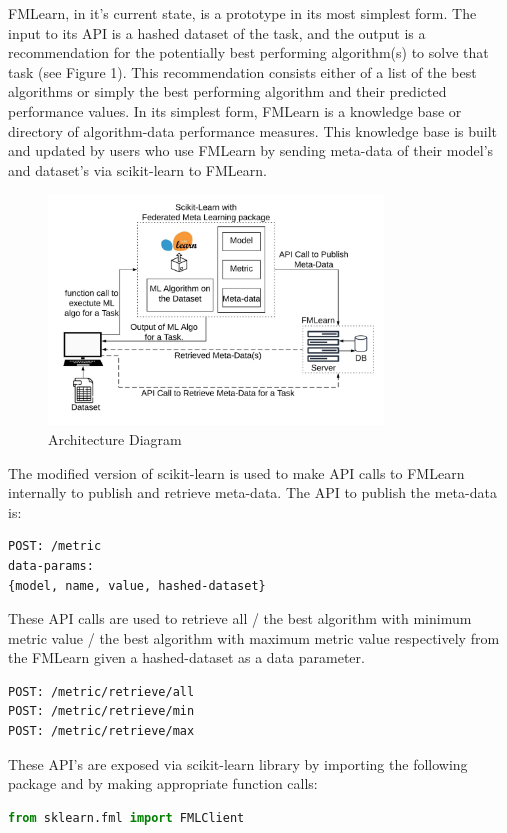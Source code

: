 \documentclass{article}
\begin{document}
FMLearn, in it's current state, is a prototype in its most simplest form. The input to its API is a hashed dataset of the task, and the output is a recommendation for the potentially best performing algorithm(s) to solve that task (see Figure 1). This recommendation consists either of a list of the best algorithms or simply the best performing algorithm and their predicted performance values. In its simplest form, FMLearn is a knowledge base or directory of algorithm-data performance measures. This knowledge base is built and updated by users who use FMLearn by sending meta-data of their model’s and dataset’s  via scikit-learn to FMLearn.

\begin{figure}[ht]
    \centering
    \includegraphics[width=3.5in]{architecture-diagram.jpeg}
    \caption{Architecture Diagram}
    \label{architecture-diagram}
\end{figure}

The modified version of scikit-learn is used to make API calls to FMLearn internally to publish and retrieve meta-data. The API to publish the meta-data is:
\begin{lstlisting}
POST: /metric
data-params: 
{model, name, value, hashed-dataset}
\end{lstlisting}

These API calls are used to retrieve all / the best algorithm with minimum metric value / the best algorithm with maximum metric value respectively from the FMLearn given a hashed-dataset as a data parameter.
\begin{lstlisting}
POST: /metric/retrieve/all
POST: /metric/retrieve/min
POST: /metric/retrieve/max
\end{lstlisting}

These API's are exposed via scikit-learn library by importing the following package and by making appropriate function calls:
\begin{lstlisting}[language=python]
from sklearn.fml import FMLClient
\end{lstlisting}
\end{document}

